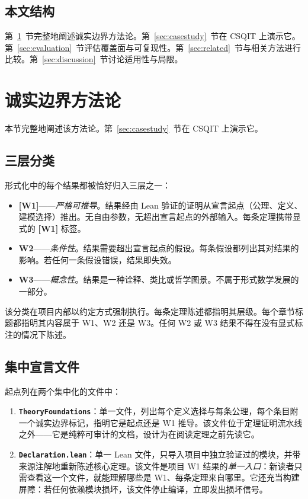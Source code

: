 \documentclass[11pt]{ctexart}
\newcommand{\wone}[1]{\textcolor{wcolor}{\textbf{[#1]}}}
\begin{document}
\subsection{本文结构}
第~\ref{sec:methodology}~节完整地阐述诚实边界方法论。第~\ref{sec:casestudy}~节在 CSQIT 上演示它。第~\ref{sec:evaluation}~节评估覆盖面与可复现性。第~\ref{sec:related}~节与相关方法进行比较。第~\ref{sec:discussion}~节讨论适用性与局限。

\section{诚实边界方法论}
\label{sec:methodology}

本节完整地阐述该方法论。第~\ref{sec:casestudy}~节在 CSQIT 上演示它。

\subsection{三层分类}
形式化中的每个结果都被恰好归入三层之一：

\begin{itemize}
\item \wone{W1}——\emph{严格可推导}。结果经由 Lean 验证的证明从宣言起点（公理、定义、建模选择）推出。无自由参数，无超出宣言起点的外部输入。每条定理携带显式的 \wone{W1} 标签。
\item \textbf{W2}——\emph{条件性}。结果需要超出宣言起点的假设。每条假设都列出其对结果的影响。若任何一条假设错误，结果即失效。
\item \textbf{W3}——\emph{概念性}。结果是一种诠释、类比或哲学图景。不属于形式数学发展的一部分。
\end{itemize}

该分类在项目内部以约定方式强制执行。每条定理陈述都指明其层级。每个章节标题都指明其内容属于 W1、W2 还是 W3。任何 W2 或 W3 结果不得在没有显式标注的情况下陈述。

\subsection{集中宣言文件}
起点列在两个集中化的文件中：

\begin{enumerate}
\item \textbf{\texttt{TheoryFoundations}}：单一文件，列出每个定义选择与每条公理，每个条目附一个诚实边界标记，指明它是起点还是 W1 推导。该文件位于定理证明流水线之外——它是纯粹可审计的文档，设计为在阅读定理之前先读它。
\item \textbf{\texttt{Declaration.lean}}：单一 Lean 文件，只导入项目中独立验证过的模块，并带来源注解地重新陈述核心定理。该文件是项目 W1 结果的\emph{单一入口}：新读者只需查看这一个文件，就能理解哪些是 W1、每条定理来自哪里。它还充当构建屏障：若任何依赖模块损坏，该文件停止编译，立即发出损坏信号。
\end{enumerate}
\end{document}
